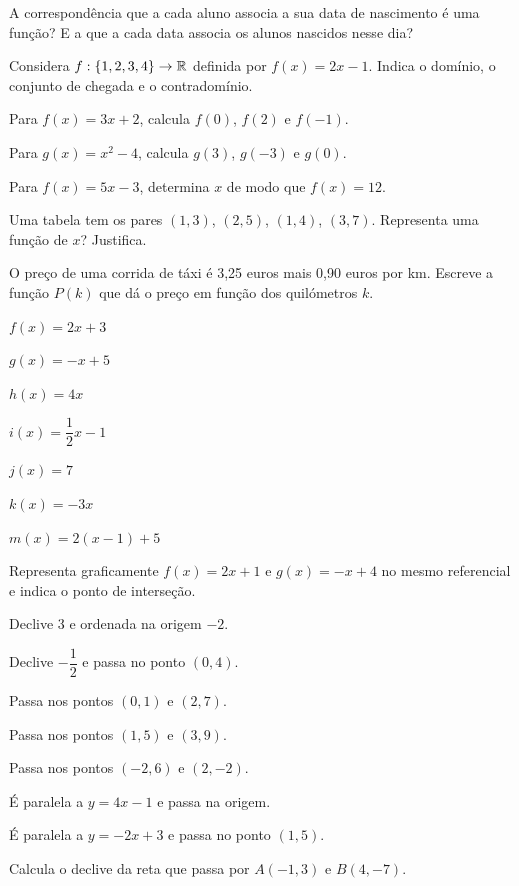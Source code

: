 \documentclass[12pt]{article}
\begin{document}
\begin{exercicios}
  \item A correspondência que a cada aluno associa a sua data de nascimento é uma função? E a que a cada data associa os alunos nascidos nesse dia?
  \item Considera $f : \{1, 2, 3, 4\} \to \mathbb{R}$ definida por $f(x) = 2x - 1$. Indica o domínio, o conjunto de chegada e o contradomínio.
  \item Para $f(x) = 3x + 2$, calcula $f(0)$, $f(2)$ e $f(-1)$.
  \item Para $g(x) = x^2 - 4$, calcula $g(3)$, $g(-3)$ e $g(0)$.
  \item Para $f(x) = 5x - 3$, determina $x$ de modo que $f(x) = 12$.
  \item Uma tabela tem os pares $(1, 3)$, $(2, 5)$, $(1, 4)$, $(3, 7)$. Representa uma função de $x$? Justifica.
  \item O preço de uma corrida de táxi é 3,25 euros mais 0,90 euros por km. Escreve a função $P(k)$ que dá o preço em função dos quilómetros $k$.
\end{exercicios}

\begin{exercicios}
  \item $f(x) = 2x + 3$
  \item $g(x) = -x + 5$
  \item $h(x) = 4x$
  \item $i(x) = \dfrac{1}{2}x - 1$
  \item $j(x) = 7$
  \item $k(x) = -3x$
  \item $m(x) = 2(x - 1) + 5$
  \item Representa graficamente $f(x) = 2x + 1$ e $g(x) = -x + 4$ no mesmo referencial e indica o ponto de interseção.
\end{exercicios}

\begin{exercicios}
  \item Declive 3 e ordenada na origem $-2$.
  \item Declive $-\dfrac{1}{2}$ e passa no ponto $(0, 4)$.
  \item Passa nos pontos $(0, 1)$ e $(2, 7)$.
  \item Passa nos pontos $(1, 5)$ e $(3, 9)$.
  \item Passa nos pontos $(-2, 6)$ e $(2, -2)$.
  \item É paralela a $y = 4x - 1$ e passa na origem.
  \item É paralela a $y = -2x + 3$ e passa no ponto $(1, 5)$.
  \item Calcula o declive da reta que passa por $A(-1, 3)$ e $B(4, -7)$.
\end{exercicios}
\end{document}
